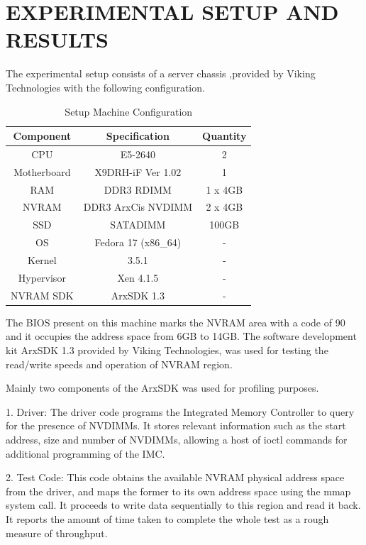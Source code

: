 

\chapter{\uppercase{Experimental Setup and Results}}

The experimental setup consists of a server chassis \cite{arxcis},provided by Viking Technologies with the following configuration. 


\begin{table}[H]
\centering
\caption{Setup Machine Configuration}
\label{tab:setup_conf}
\begin{tabular}{|c|c|c|}
    \hline
    Component & Specification & Quantity \\
    \hline
    \hline
    CPU & E5-2640 & 2                    \\
    \hline
    Motherboard & X9DRH-iF Ver 1.02 & 1  \\
    \hline
    RAM & DDR3 RDIMM & 1 x 4GB           \\
    \hline
    NVRAM & DDR3 ArxCis NVDIMM & 2 x 4GB \\
    \hline
    SSD & SATADIMM & 100GB               \\
    \hline
    OS & Fedora 17 (x86\_64) & -         \\
    \hline
    Kernel & 3.5.1 & -                   \\
    \hline
    Hypervisor & Xen 4.1.5 & -           \\
    \hline
    NVRAM SDK & ArxSDK 1.3 & -           \\
    \hline
\end{tabular}
\end{table}

The BIOS present on this machine marks the NVRAM area with a code of 90 and it occupies the address space from 6GB to 14GB. The software development kit ArxSDK 1.3 provided by Viking Technologies, was used for testing the read/write speeds and operation of NVRAM region.

Mainly two components of the ArxSDK was used for profiling purposes.

1. Driver: The driver code programs the Integrated Memory Controller to query for the presence of NVDIMMs. It stores relevant information such as the start address, size and number of NVDIMMs, allowing a host of ioctl commands for additional programming of the IMC.

2. Test Code: This code obtains the available NVRAM physical address space from the driver, and maps the former to its own address space using the mmap system call. It proceeds to write data sequentially to this region and read it back. It reports the amount of time taken to complete the whole test as a rough measure of throughput.

